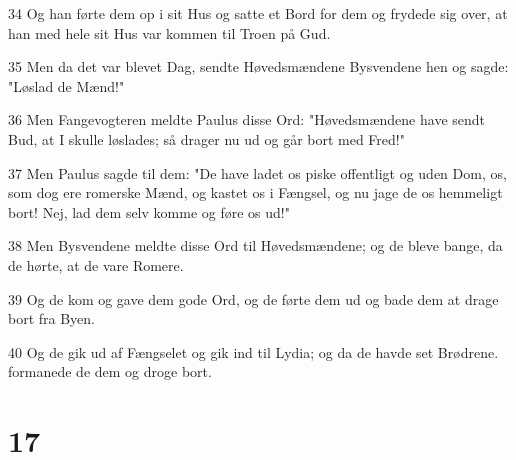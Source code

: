 \par 34 Og han førte dem op i sit Hus og satte et Bord for dem og frydede sig over, at han med hele sit Hus var kommen til Troen på Gud.
\par 35 Men da det var blevet Dag, sendte Høvedsmændene Bysvendene hen og sagde: "Løslad de Mænd!"
\par 36 Men Fangevogteren meldte Paulus disse Ord: "Høvedsmændene have sendt Bud, at I skulle løslades; så drager nu ud og går bort med Fred!"
\par 37 Men Paulus sagde til dem: "De have ladet os piske offentligt og uden Dom, os, som dog ere romerske Mænd, og kastet os i Fængsel, og nu jage de os hemmeligt bort! Nej, lad dem selv komme og føre os ud!"
\par 38 Men Bysvendene meldte disse Ord til Høvedsmændene; og de bleve bange, da de hørte, at de vare Romere.
\par 39 Og de kom og gave dem gode Ord, og de førte dem ud og bade dem at drage bort fra Byen.
\par 40 Og de gik ud af Fængselet og gik ind til Lydia; og da de havde set Brødrene. formanede de dem og droge bort.

\chapter{17}

